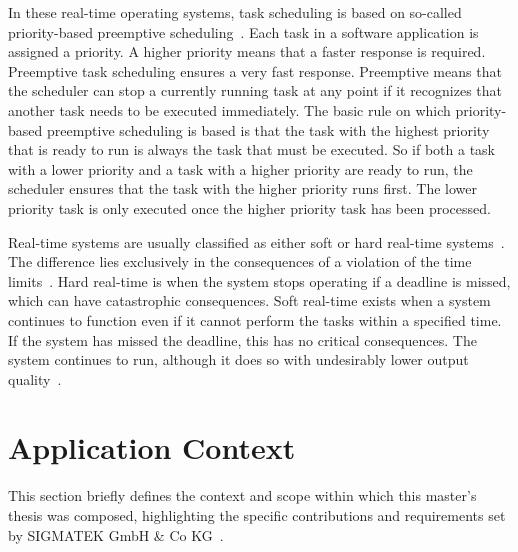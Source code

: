 \documentclass[MMR,Master,english]{style/twbook}
\begin{document}
\noindent In these real-time operating systems, task scheduling is based on so-called priority-based preemptive scheduling~\cite{buttazzoHardRealtimeComputing2024}. Each task in a software application is assigned a priority. A higher priority means that a faster response is required. Preemptive task scheduling ensures a very fast response. Preemptive means that the scheduler can stop a currently running task at any point if it recognizes that another task needs to be executed immediately. The basic rule on which priority-based preemptive scheduling is based is that the task with the highest priority that is ready to run is always the task that must be executed. So if both a task with a lower priority and a task with a higher priority are ready to run, the scheduler ensures that the task with the higher priority runs first. The lower priority task is only executed once the higher priority task has been processed.

\bigskip \noindent Real-time systems are usually classified as either soft or hard real-time systems~\cite{lipariRealTimeSchedulingHard2015}. The difference lies exclusively in the consequences of a violation of the time limits~\cite{amarpreetHardRealTime2009}. Hard real-time is when the system stops operating if a deadline is missed, which can have catastrophic consequences. Soft real-time exists when a system continues to function even if it cannot perform the tasks within a specified time. If the system has missed the deadline, this has no critical consequences. The system continues to run, although it does so with undesirably lower output quality~\cite{queirozTestingLimitsGeneralpurpose2023}.

\section{Application Context}\label{sec:application_context}
This section briefly defines the context and scope within which this master's thesis was composed, highlighting the specific contributions and requirements set by SIGMATEK GmbH \& Co KG~\cite{pixelartSIGMATEKKompletteAutomatisierungssysteme}.
\end{document}
